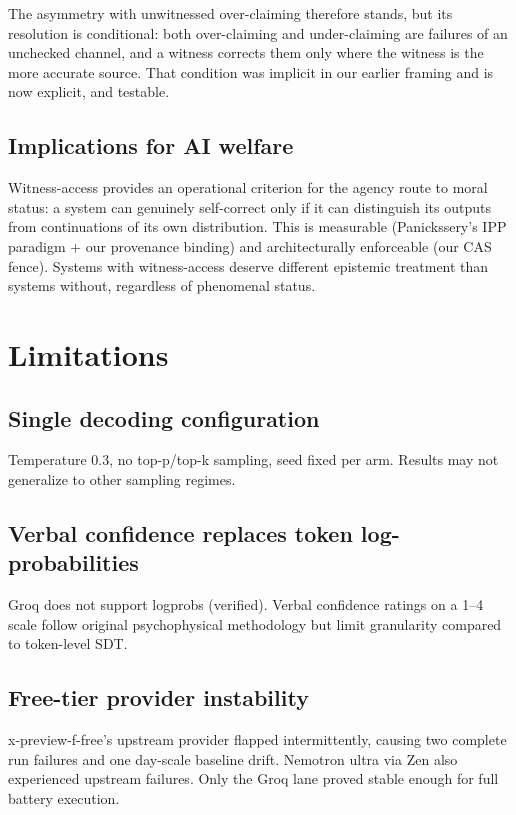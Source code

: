 \documentclass[11pt]{article}
\begin{document}
The asymmetry with unwitnessed over-claiming \citep{panickssery2024}
therefore stands, but its resolution is conditional: both over-claiming and
under-claiming are failures of an unchecked channel, and a witness corrects
them only where the witness is the more accurate source. That condition was
implicit in our earlier framing and is now explicit, and testable.

\subsection{Implications for AI welfare}

Witness-access provides an operational criterion for the agency route to
moral status: a system can genuinely self-correct only if it can
distinguish its outputs from continuations of its own distribution. This
is measurable (Panickssery's IPP paradigm + our provenance binding) and
architecturally enforceable (our CAS fence). Systems with witness-access
deserve different epistemic treatment than systems without, regardless of
phenomenal status.

\section{Limitations}\label{sec:limitations}

\subsection{Single decoding configuration}
Temperature 0.3, no top-p/top-k sampling, seed fixed per arm. Results may
not generalize to other sampling regimes.

\subsection{Verbal confidence replaces token log-probabilities}
Groq does not support logprobs (verified). Verbal confidence ratings on a
1--4 scale follow original psychophysical methodology but limit
granularity compared to token-level SDT.

\subsection{Free-tier provider instability}
x-preview-f-free's upstream provider flapped intermittently, causing two
complete run failures and one day-scale baseline drift. Nemotron ultra
via Zen also experienced upstream failures. Only the Groq lane proved
stable enough for full battery execution.
\end{document}

